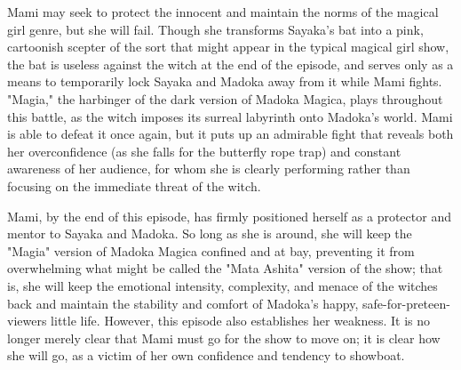 Mami may seek to protect the innocent and maintain the norms of the magical girl genre, but she will fail. Though she transforms Sayaka's bat into a pink, cartoonish scepter of the sort that might appear in the typical magical girl show, the bat is useless against the witch at the end of the episode, and serves only as a means to temporarily lock Sayaka and Madoka away from it while Mami fights. "Magia," the harbinger of the dark version of Madoka Magica, plays throughout this battle, as the witch imposes its surreal labyrinth onto Madoka's world. Mami is able to defeat it once again, but it puts up an admirable fight that reveals both her overconfidence (as she falls for the butterfly rope trap) and constant awareness of her audience, for whom she is clearly performing rather than focusing on the immediate threat of the witch.

Mami, by the end of this episode, has firmly positioned herself as a protector and mentor to Sayaka and Madoka. So long as she is around, she will keep the "Magia" version of Madoka Magica confined and at bay, preventing it from overwhelming what might be called the "Mata Ashita" version of the show; that is, she will keep the emotional intensity, complexity, and menace of the witches back and maintain the stability and comfort of Madoka's happy, safe-for-preteen-viewers little life. However, this episode also establishes her weakness. It is no longer merely clear that Mami must go for the show to move on; it is clear how she will go, as a victim of her own confidence and tendency to showboat.
